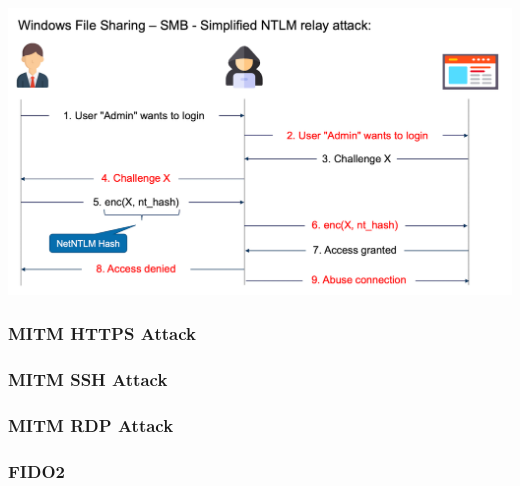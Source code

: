 \begin{center}
    \vspace{-8pt}
    \includegraphics[width=1.0\linewidth]{./img/09-mitm/mitm_enctypt_3}
    \vspace{-8pt}
\end{center}


\subsubsection{MITM HTTPS Attack}

\subsubsection{MITM SSH Attack}

\subsubsection{MITM RDP Attack}

\subsubsection{FIDO2}

